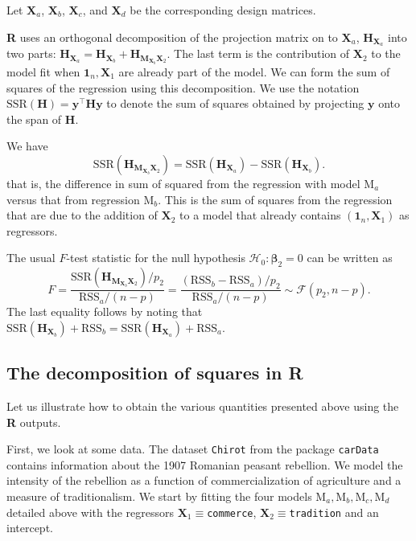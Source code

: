 \documentclass[]{book}
\theoremstyle{definition}
\theoremstyle{definition}
\theoremstyle{definition}
\theoremstyle{remark}
\begin{document}
Let \(\mathbf{X}_a\), \(\mathbf{X}_b\), \(\mathbf{X}_c\), and \(\mathbf{X}_d\) be the corresponding design matrices.

\textbf{R} uses an orthogonal decomposition of the projection matrix on to \(\mathbf{X}_a\), \(\mathbf{H}_{\mathbf{X}_a}\) into two parts: \(\mathbf{H}_{\mathbf{X}_a}= \mathbf{H}_{\mathbf{X}_b} + \mathbf{H}_{\mathbf{M}_{\mathbf{X}_b}\mathbf{X}_2}.\) The last term is the contribution of \(\mathbf{X}_2\) to the model fit when \(\mathbf{1}_n, \mathbf{X}_1\) are already part of the model. We can form the sum of squares of the regression using this decomposition. We use the notation \(\mathrm{SSR}(\mathbf{H}) = \boldsymbol{y}^\top\mathbf{H}\boldsymbol{y}\) to denote the sum of squares obtained by projecting \(\boldsymbol{y}\) onto the span of \(\mathbf{H}\).

We have
\[\mathrm{SSR}(\mathbf{H}_{\mathbf{M}_{\mathbf{X}_b}\mathbf{X}_2}) = \mathrm{SSR}(\mathbf{H}_{\mathbf{X}_a}) - \mathrm{SSR}(\mathbf{H}_{\mathbf{X}_b}).\]
that is, the difference in sum of squared from the regression with model \(\mathrm{M}_a\) versus that from regression \(\mathrm{M}_b.\) This is the sum of squares from the regression that are due to the addition of \(\mathbf{X}_2\) to a model that already contains \((\mathbf{1}_n, \mathbf{X}_1)\) as regressors.

The usual \(F\)-test statistic for the null hypothesis \(\mathscr{H}_0: \boldsymbol{\beta}_2=0\) can be written as
\[F = \frac{\mathrm{SSR}(\mathbf{H}_{\mathbf{M}_{\mathbf{X}_b}\mathbf{X}_2})/p_2}{\mathrm{RSS}_a/(n-p)} = \frac{(\mathrm{RSS}_b-\mathrm{RSS}_a)/p_2}{\mathrm{RSS}_a/(n-p)} \sim \mathcal{F}(p_2, n-p).\]
The last equality follows by noting that \(\mathrm{SSR}(\mathbf{H}_{\mathbf{X}_b})+ \mathrm{RSS}_b=\mathrm{SSR}(\mathbf{H}_{\mathbf{X}_a})+ \mathrm{RSS}_a\).

\hypertarget{the-decomposition-of-squares-in-r}{%
\subsection{\texorpdfstring{The decomposition of squares in \textbf{R}}{The decomposition of squares in R}}\label{the-decomposition-of-squares-in-r}}

Let us illustrate how to obtain the various quantities presented above using the \textbf{R} outputs.

First, we look at some data. The dataset \texttt{Chirot} from the package \texttt{carData} contains information about the 1907 Romanian peasant rebellion. We model the intensity of the rebellion as a function of commercialization of agriculture and a measure of traditionalism. We start by fitting the four models \(\mathrm{M}_a, \mathrm{M}_b, \mathrm{M}_c, \mathrm{M}_d\) detailed above with the regressors \(\mathbf{X}_1 \equiv\)\texttt{commerce}, \(\mathbf{X}_2 \equiv\)\texttt{tradition} and an intercept.
\end{document}
